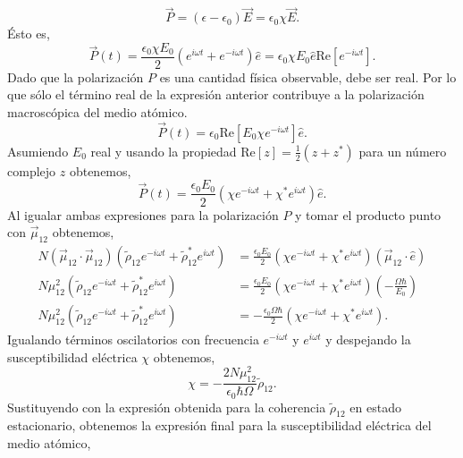 \begin{equation}
    \vec{P} = (\epsilon- \epsilon_0) \vec{E} = \epsilon_0 \chi \vec{E}.
\end{equation}
Ésto es,
\begin{equation}
    \vec{P}(t) = \frac{\epsilon_0 \chi E_0 }{2}(e^{i \omega t} + e^{-i \omega t})\hat{e} = \epsilon_0 \chi E_0 \hat{e} \text{Re}[e^{-i \omega t}].
\end{equation}
Dado que la polarización $P$ es una cantidad física observable, debe ser real. Por lo que sólo el término real de la expresión anterior contribuye a la polarización macroscópica del medio atómico. 
\begin{equation}
    \vec{P}(t) = \epsilon_0 \text{Re}[E_0 \chi e^{-i \omega t}] \hat{e}.
\end{equation}
Asumiendo $E_0$ real y usando la propiedad $\text{Re}[z] = \frac{1}{2}(z + z^*)$ para un número complejo $z$ obtenemos,
\begin{equation}
\boxed{
    \vec{P}(t) = \frac{\epsilon_0 E_0}{2} (\chi e^{-i \omega t} + \chi^* e^{i \omega t}) \hat{e}.
}
\end{equation}
Al igualar ambas expresiones para la polarización $P$ y tomar el producto punto con $\vec{\mu}_{12}$ obtenemos,
\begin{equation}
\begin{split}
    N (\vec{\mu}_{12} \cdot \vec{\mu}_{12}) (\tilde{\rho}_{12}e^{-i \omega t}  + \tilde{\rho}_{12}^*e^{i \omega t}) &= \frac{\epsilon_0 E_0}{2} (\chi e^{-i \omega t} + \chi^* e^{i \omega t}) (\vec{\mu}_{12} \cdot \hat{e})\\
    N \mu_{12}^2 (\tilde{\rho}_{12}e^{-i \omega t}  + \tilde{\rho}_{12}^*e^{i \omega t}) &= \frac{\epsilon_0 E_0}{2} (\chi e^{-i \omega t} + \chi^* e^{i \omega t}) (-\frac{\Omega \hbar}{E_0})\\
    N \mu_{12}^2 (\tilde{\rho}_{12}e^{-i \omega t}  + \tilde{\rho}_{12}^*e^{i \omega t}) &= -\frac{\epsilon_0 \Omega \hbar}{2} (\chi e^{-i \omega t} + \chi^* e^{i \omega t}).
\end{split}
\end{equation}
Igualando términos oscilatorios con frecuencia $e^{-i \omega t}$ y $e^{i \omega t}$ y despejando la susceptibilidad eléctrica $\chi$ obtenemos,
\begin{equation}
    \chi = -\frac{2 N \mu_{12}^2}{\epsilon_0 \hbar \Omega} \tilde{\rho}_{12}.
\end{equation}
Sustituyendo con la expresión obtenida para la coherencia $\tilde{\rho}_{12}$ en estado estacionario, obtenemos la expresión final para la susceptibilidad eléctrica del medio atómico,
